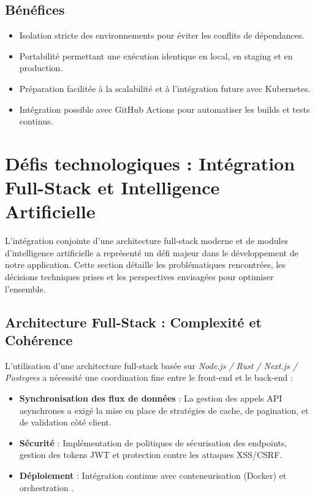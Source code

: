 \documentclass[12pt]{rapportPfe}
\begin{document}
\subsection{Bénéfices}

\begin{itemize}
    \item Isolation stricte des environnements pour éviter les conflits de dépendances.
    \item Portabilité permettant une exécution identique en local, en staging et en production.
    \item Préparation facilitée à la scalabilité et à l’intégration future avec Kubernetes.
    \item Intégration possible avec GitHub Actions pour automatiser les builds et tests continus.
\end{itemize}

\section{Défis technologiques : Intégration Full-Stack et Intelligence Artificielle}

L’intégration conjointe d’une architecture full-stack moderne et de modules d’intelligence artificielle a représenté un défi majeur dans le développement de notre application. Cette section détaille les problématiques rencontrées, les décisions techniques prises et les perspectives envisagées pour optimiser l’ensemble.

\subsection{Architecture Full-Stack : Complexité et Cohérence}

L’utilisation d’une architecture full-stack basée sur \textit{Node.js / Rust / Next.js / Postegres} a nécessité une coordination fine entre le front-end et le back-end :

\begin{itemize}
    \item \textbf{Synchronisation des flux de données} : La gestion des appels API asynchrones a exigé la mise en place de stratégies de cache, de pagination, et de validation côté client.
    \item \textbf{Sécurité} : Implémentation de politiques de sécurisation des endpoints, gestion des tokens JWT et protection contre les attaques XSS/CSRF.
    \item \textbf{Déploiement} : Intégration continue avec conteneurisation (Docker) et orchestration .
\end{itemize}
\end{document}
